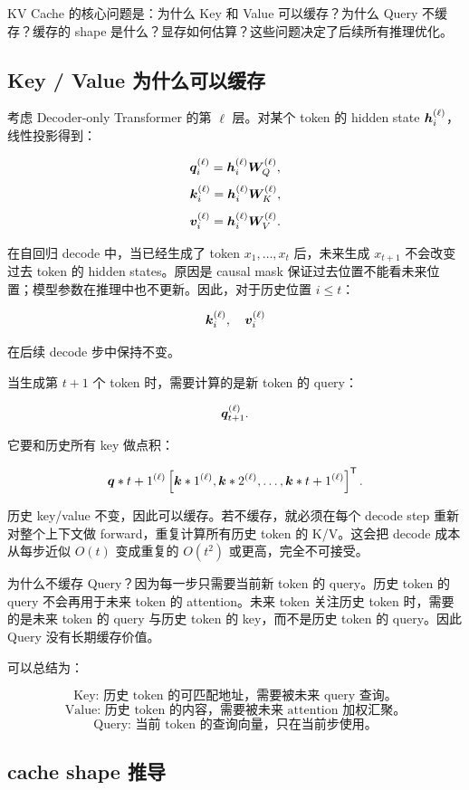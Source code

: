KV Cache 的核心问题是：为什么 Key 和 Value 可以缓存？为什么 Query 不缓存？缓存的 shape 是什么？显存如何估算？这些问题决定了后续所有推理优化。

\subsection{Key / Value 为什么可以缓存}
\label{subsec:why-cache-key-value}

考虑 Decoder-only Transformer 的第 $\ell$ 层。对某个 token 的 hidden state $\bm{h}_i^{(\ell)}$，线性投影得到：

\[
\bm{q}_i^{(\ell)}=\bm{h}_i^{(\ell)}\bm{W}_Q^{(\ell)},
\]
\[
\bm{k}_i^{(\ell)}=\bm{h}_i^{(\ell)}\bm{W}_K^{(\ell)},
\]
\[
\bm{v}_i^{(\ell)}=\bm{h}_i^{(\ell)}\bm{W}_V^{(\ell)}.
\]

在自回归 decode 中，当已经生成了 token $x_1,\ldots,x_t$ 后，未来生成 $x_{t+1}$ 不会改变过去 token 的 hidden states。原因是 causal mask 保证过去位置不能看未来位置；模型参数在推理中也不更新。因此，对于历史位置 $i\le t$：

\[
\bm{k}_i^{(\ell)},\quad
\bm{v}_i^{(\ell)}
\]

在后续 decode 步中保持不变。

当生成第 $t+1$ 个 token 时，需要计算的是新 token 的 query：

\[
\bm{q}_{t+1}^{(\ell)}.
\]

它要和历史所有 key 做点积：

\[
\bm{q}*{t+1}^{(\ell)}
\left[
\bm{k}*{1}^{(\ell)},
\bm{k}*{2}^{(\ell)},
\ldots,
\bm{k}*{t+1}^{(\ell)}
\right]^{\mathsf{T}}.
\]

历史 key/value 不变，因此可以缓存。若不缓存，就必须在每个 decode step 重新对整个上下文做 forward，重复计算所有历史 token 的 K/V。这会把 decode 成本从每步近似 $O(t)$ 变成重复的 $O(t^2)$ 或更高，完全不可接受。

为什么不缓存 Query？因为每一步只需要当前新 token 的 query。历史 token 的 query 不会再用于未来 token 的 attention。未来 token 关注历史 token 时，需要的是未来 token 的 query 与历史 token 的 key，而不是历史 token 的 query。因此 Query 没有长期缓存价值。

可以总结为：

\[
\text{Key: 历史 token 的可匹配地址，需要被未来 query 查询。}
\]
\[
\text{Value: 历史 token 的内容，需要被未来 attention 加权汇聚。}
\]
\[
\text{Query: 当前 token 的查询向量，只在当前步使用。}
\]

\subsection{cache shape 推导}
\label{subsec:kv-cache-shape-derivation}

